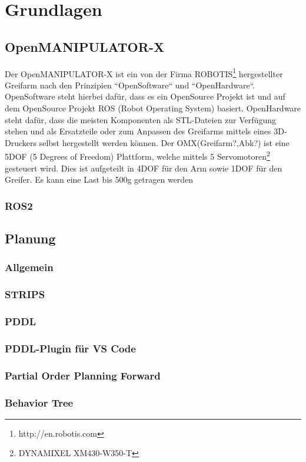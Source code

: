 \chapter {Grundlagen}
\section{OpenMANIPULATOR-X}
Der OpenMANIPULATOR-X ist ein von der Firma ROBOTIS{\footnote{http://en.robotis.com}} hergestellter Greifarm nach den Prinzipien ``OpenSoftware`` und ``OpenHardware``. OpenSoftware steht hierbei dafür, dass es ein OpenSource Projekt ist und auf dem OpenSource Projekt ROS (Robot Operating System) basiert. OpenHardware steht dafür, dass die meisten Komponenten als STL-Dateien zur Verfügung stehen und als Ersatzteile oder zum Anpassen des Greifarms mittels eines 3D-Druckers selbst hergestellt werden können. \newline
Der OMX(Greifarm?,Abk?) ist eine 5DOF (5 Degrees of Freedom) Plattform, welche mittels 5 Servomotoren{\footnote{DYNAMIXEL XM430-W350-T}} gesteuert wird. Dies ist aufgeteilt in 4DOF für den Arm sowie 1DOF für den Greifer.
Es kann eine Last bis 500g getragen werden
\subsection{ROS2}
\section {Planung}
\subsection{Allgemein}
\subsection{STRIPS}
\subsection{PDDL}
\subsection{PDDL-Plugin für VS Code}
\subsection{Partial Order Planning Forward}
\subsection{Behavior Tree}

\newpage